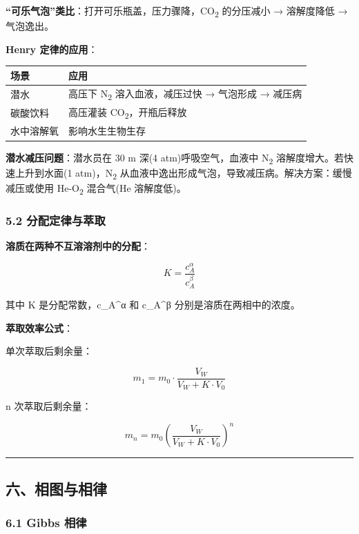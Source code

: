 \textbf{``可乐气泡''类比}：打开可乐瓶盖，压力骤降，CO\textsubscript{2} 的分压减小 → 溶解度降低 → 气泡逸出。

\textbf{Henry 定律的应用}：

{\def\LTcaptype{none} %
\begin{longtable}[]{@{}ll@{}}
\toprule\noalign{}
场景 & 应用 \\
\midrule\noalign{}
\endhead
\bottomrule\noalign{}
\endlastfoot
潜水 & 高压下 N\textsubscript{2} 溶入血液，减压过快 → 气泡形成 → 减压病 \\
碳酸饮料 & 高压灌装 CO\textsubscript{2}，开瓶后释放 \\
水中溶解氧 & 影响水生生物生存 \\
\end{longtable}
}

\textbf{潜水减压问题}：潜水员在 30 m 深(4 atm)呼吸空气，血液中 N\textsubscript{2} 溶解度增大。若快速上升到水面(1 atm)，N\textsubscript{2} 从血液中逸出形成气泡，导致减压病。解决方案：缓慢减压或使用 He-O\textsubscript{2} 混合气(He 溶解度低)。

\subsubsection{5.2 分配定律与萃取}\label{ux5206ux914dux5b9aux5f8bux4e0eux8403ux53d6}

\textbf{溶质在两种不互溶溶剂中的分配}：

\[
\boxed{K = \frac{c_A^\alpha}{c_A^\beta}}
\]

其中 K 是分配常数，c\_A\^{}α 和 c\_A\^{}β 分别是溶质在两相中的浓度。

\textbf{萃取效率公式}：

单次萃取后剩余量：

\[
m_1 = m_0 \cdot \frac{V_W}{V_W + K \cdot V_0}
\]

n 次萃取后剩余量：

\[
m_n = m_0 \left(\frac{V_W}{V_W + K \cdot V_0}\right)^n
\]

\begin{center}\rule{0.5\linewidth}{0.5pt}\end{center}

\subsection{六、相图与相律}\label{ux516dux76f8ux56feux4e0eux76f8ux5f8b}

\subsubsection{6.1 Gibbs 相律}\label{gibbs-ux76f8ux5f8b}

